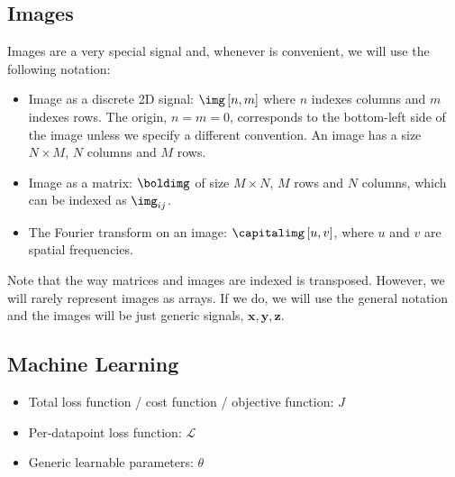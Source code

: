 \subsection*{Images}

Images are a very special signal and, whenever is convenient, we will use the following notation:
\begin{itemize}
\item Image as a discrete 2D signal: $\img \left[ n,m \right]$ where $n$ indexes columns and $m$ indexes rows. The origin, $n=m=0$, corresponds to the bottom-left side of the image unless we specify a different convention. An image has a size $N \times M$, $N$ columns and $M$ rows. 
\item Image as a matrix: $\boldimg$ of size $M \times N$, $M$ rows and $N$ columns, which can be indexed as $\img_{ij}$.
\item The Fourier transform on an image: $\capitalimg \left[ u,v\right]$, where $u$ and $v$ are spatial frequencies.
\end{itemize}
Note that the way matrices and images are indexed is transposed. However, we will rarely represent images as arrays. If we do, we will use the general notation and the images will be just generic signals, $\mathbf{x}, \mathbf{y}, \mathbf{z}$. 

\subsection*{Machine Learning}
\begin{itemize}
    \item Total loss function / cost function / objective function: $J$
    \item Per-datapoint loss function: $\mathcal{L}$
    \item Generic learnable parameters: $\theta$
\end{itemize}


